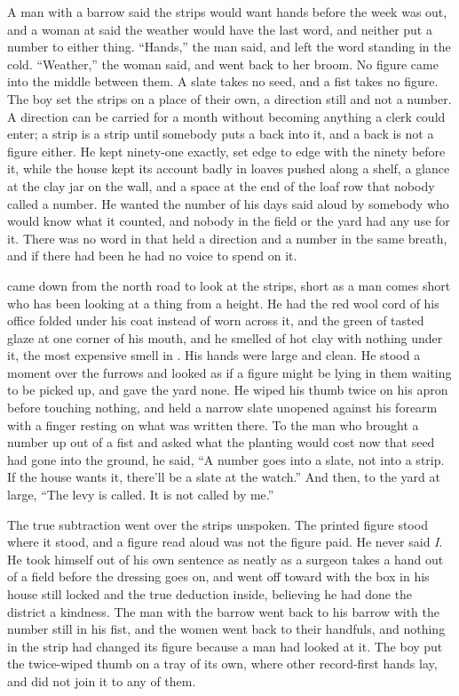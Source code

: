 A man with a barrow said the strips would want hands before the week was out, and a woman at  said the weather would have the last word, and neither put a number to either thing. “Hands,” the man said, and left the word standing in the cold. “Weather,” the woman said, and went back to her broom. No figure came into the middle between them. A slate takes no seed, and a fist takes no figure. The boy set the strips on a place of their own, a direction still and not a number. A direction can be carried for a month without becoming anything a clerk could enter; a strip is a strip until somebody puts a back into it, and a back is not a figure either. He kept ninety-one exactly, set edge to edge with the ninety before it, while the house kept its account badly in loaves pushed along a shelf, a glance at the clay jar on the wall, and a space at the end of the loaf row that nobody called a number. He wanted the number of his days said aloud by somebody who would know what it counted, and nobody in the field or the yard had any use for it. There was no word in  that held a direction and a number in the same breath, and if there had been he had no voice to spend on it.

 came down from the north road to look at the strips, short as a man comes short who has been looking at a thing from a height. He had the red wool cord of his office folded under his coat instead of worn across it, and the green of tasted glaze at one corner of his mouth, and he smelled of hot clay with nothing under it, the most expensive smell in . His hands were large and clean. He stood a moment over the furrows and looked as if a figure might be lying in them waiting to be picked up, and gave the yard none. He wiped his thumb twice on his apron before touching nothing, and held a narrow slate unopened against his forearm with a finger resting on what was written there. To the man who brought a number up out of a fist and asked what the planting would cost now that seed had gone into the ground, he said, “A number goes into a slate, not into a strip. If the house wants it, there'll be a slate at the watch.” And then, to the yard at large, “The levy is called. It is not called by me.”

The true subtraction went over the strips unspoken. The printed figure stood where it stood, and a figure read aloud was not the figure paid. He never said \emph{I}. He took himself out of his own sentence as neatly as a surgeon takes a hand out of a field before the dressing goes on, and went off toward  with the box in his house still locked and the true deduction inside, believing he had done the district a kindness. The man with the barrow went back to his barrow with the number still in his fist, and the women went back to their handfuls, and nothing in the strip had changed its figure because a man had looked at it. The boy put the twice-wiped thumb on a tray of its own, where other record-first hands lay, and did not join it to any of them.

